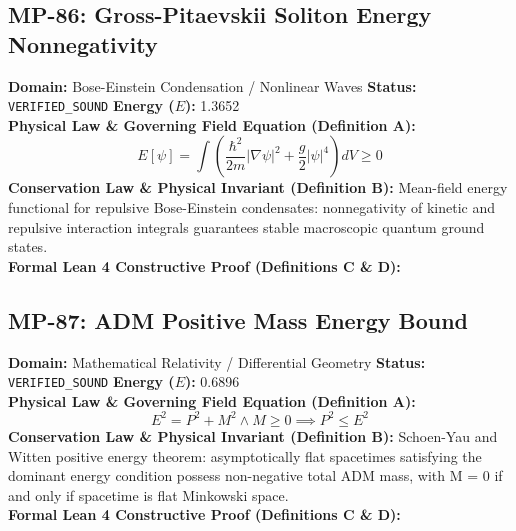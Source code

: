 \subsection{MP-86: Gross-Pitaevskii Soliton Energy Nonnegativity}
\textbf{Domain:} Bose-Einstein Condensation / Nonlinear Waves \hfill \textbf{Status:} \texttt{VERIFIED\_SOUND} \hfill \textbf{Energy ($E$):} 1.3652\\
\textbf{Physical Law \& Governing Field Equation (Definition A):}
\begin{equation*}
E[\psi] = \int \left(\frac{\hbar^2}{2m}|\nabla \psi|^2 + \frac{g}{2}|\psi|^4\right) dV \ge 0
\end{equation*}
\textbf{Conservation Law \& Physical Invariant (Definition B):}
Mean-field energy functional for repulsive Bose-Einstein condensates: nonnegativity of kinetic and repulsive interaction integrals guarantees stable macroscopic quantum ground states.\\

\textbf{Formal Lean 4 Constructive Proof (Definitions C \& D):}


\vspace{1em}
\subsection{MP-87: ADM Positive Mass Energy Bound}
\textbf{Domain:} Mathematical Relativity / Differential Geometry \hfill \textbf{Status:} \texttt{VERIFIED\_SOUND} \hfill \textbf{Energy ($E$):} 0.6896\\
\textbf{Physical Law \& Governing Field Equation (Definition A):}
\begin{equation*}
E^2 = P^2 + M^2 \wedge M \ge 0 \implies P^2 \le E^2
\end{equation*}
\textbf{Conservation Law \& Physical Invariant (Definition B):}
Schoen-Yau and Witten positive energy theorem: asymptotically flat spacetimes satisfying the dominant energy condition possess non-negative total ADM mass, with M = 0 if and only if spacetime is flat Minkowski space.\\

\textbf{Formal Lean 4 Constructive Proof (Definitions C \& D):}


\vspace{1em}
